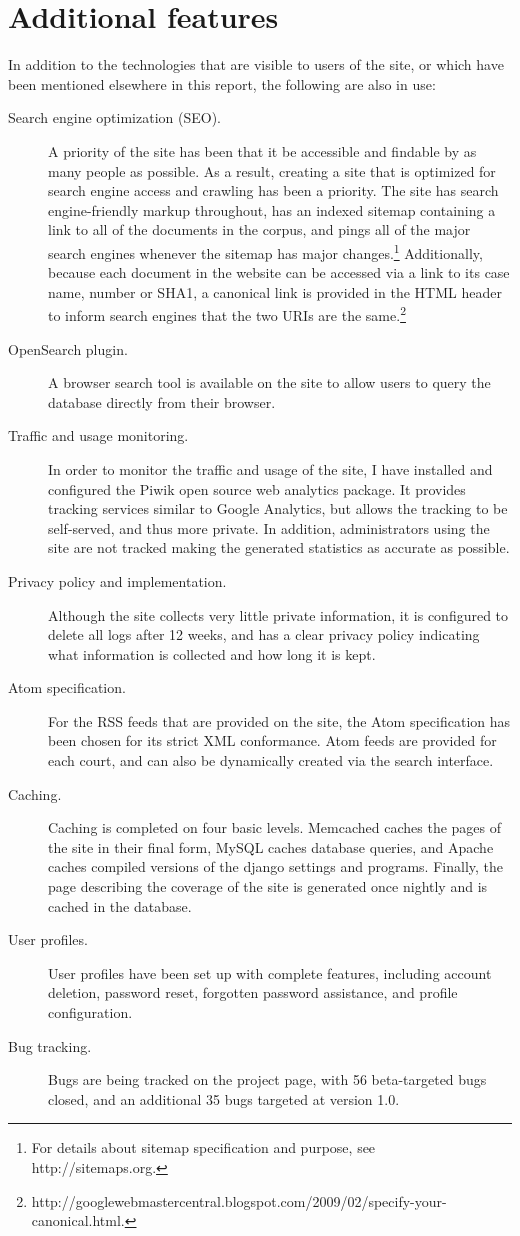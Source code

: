 \section{Additional features}
In addition to the technologies that are visible to users of the site, or which have been mentioned elsewhere in this report, the following are also in use:
\begin{description}
    \item[Search engine optimization (SEO).] A priority of the site has been that it be accessible and findable by as many people as possible. As a result, creating a site that is optimized for search engine access and crawling has been a priority. The site has search engine-friendly markup throughout, has an indexed sitemap containing a link to all of the documents in the corpus, and pings all of the major search engines whenever the sitemap has major changes.\footnote{For details about sitemap specification and purpose, see http://sitemaps.org.} Additionally, because each document in the website can be accessed via a link to its case name, number or SHA1, a canonical link is provided in the HTML header to inform search engines that the two URIs are the same.\footnote{http://googlewebmastercentral.blogspot.com/2009/02/specify-your-canonical.html.}
    \item[OpenSearch plugin.] A browser search tool is available on the site to allow users to query the database directly from their browser.
    \item[Traffic and usage monitoring.] In order to monitor the traffic and usage of the site, I have installed and configured the Piwik open source web analytics package. It provides tracking services similar to Google Analytics, but allows the tracking to be self-served, and thus more private. In addition, administrators using the site are not tracked making the generated statistics as accurate as possible.
    \item[Privacy policy and implementation.] Although the site collects very little private information, it is configured to delete all logs after 12 weeks, and has a clear privacy policy indicating what information is collected and how long it is kept.
    \item[Atom specification.] For the RSS feeds that are provided on the site, the Atom specification has been chosen for its strict XML conformance. Atom feeds are provided for each court, and can also be dynamically created via the search interface.
    \item[Caching.] Caching is completed on four basic levels. Memcached caches the pages of the site in their final form, MySQL caches database queries, and Apache caches compiled versions of the django settings and programs. Finally, the page describing the coverage of the site is generated once nightly and is cached in the database.
    \item[User profiles.] User profiles have been set up with complete features, including account deletion, password reset, forgotten password assistance, and profile configuration.
    \item[Bug tracking.] Bugs are being tracked on the project page, with 56 beta-targeted bugs closed, and an additional 35 bugs targeted at version 1.0.
\end{description}
